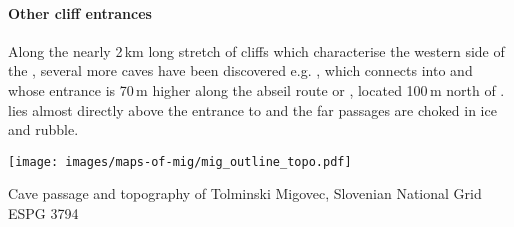 \paragraph{Other cliff entrances} Along the nearly 2\,km long stretch of cliffs which characterise the western side of the , several more caves have been discovered e.g. , which connects into  and whose entrance is 70\,m higher along the abseil route or , located 100\,m north of .  lies almost directly above the entrance to  and the far passages are choked in ice and rubble.

\begin{pagemap}
 \checkoddpage \ifoddpage \forcerectofloat \else \forceversofloat \fi
\centering
  \texttt{[image: images/maps-of-mig/mig\_outline\_topo.pdf]}
  \caption{Cave passage and topography of Tolminski Migovec, Slovenian National Grid ESPG 3794}
   \label{map:map overlay}
 \end{pagemap}